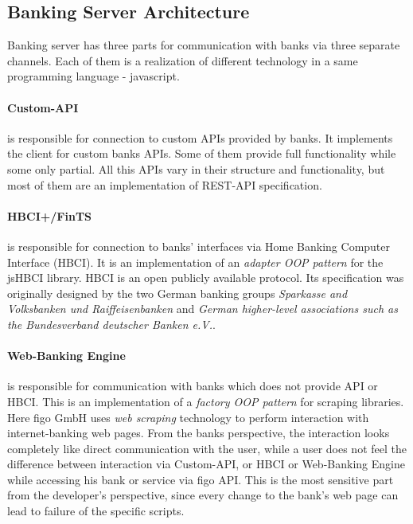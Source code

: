 \subsection{Banking Server Architecture}
\label{sec:bankingArch}
	Banking server has three parts for communication with banks via three separate channels. Each of them is a realization of different technology in a same programming language - javascript.  

	\paragraph{Custom-API} is responsible for connection to custom APIs provided by banks. It implements the client for custom banks APIs. Some of them provide full functionality while some only partial. All this APIs vary in their structure and functionality, but most of them  are an implementation of REST-API specification.
	
	\paragraph{HBCI+/FinTS} is responsible for connection to banks' interfaces via Home Banking Computer Interface (HBCI). It is an implementation of an \textit{adapter OOP pattern} for the jsHBCI library.  HBCI is an open publicly available protocol. Its specification was originally designed by the two German banking groups \textit{Sparkasse and Volksbanken und Raiffeisenbanken} and \textit{German higher-level associations such as the Bundesverband deutscher Banken e.V.}.  \cite{finTS}
	
	\paragraph{Web-Banking Engine} is responsible for communication with banks which does not provide API or HBCI. This is an implementation of a \textit{factory OOP pattern} for scraping libraries. Here figo GmbH uses \textit{web scraping} technology to perform interaction with internet-banking web pages.
	From the banks perspective, the interaction looks completely like direct communication with the user, while a user does not feel the difference between interaction via Custom-API, or HBCI or Web-Banking Engine while accessing his bank or service via figo API.
	This is the most sensitive part from the developer's perspective, since every change to the bank's web page can lead to failure of the specific scripts. \\
	
